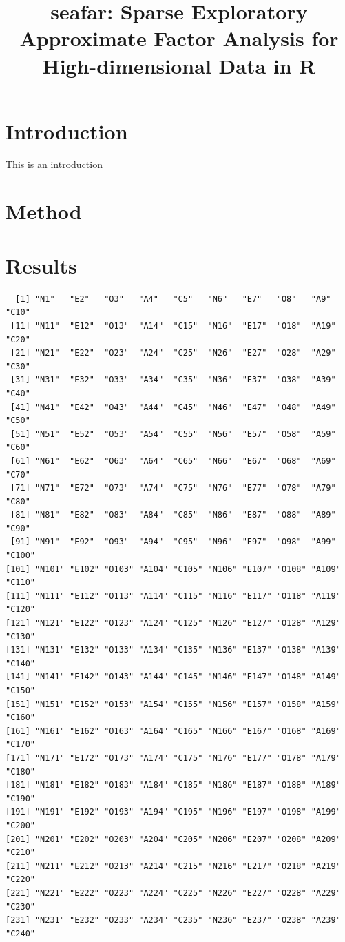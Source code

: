 \documentclass[
  man,
  floatsintext,
  longtable,
  nolmodern,
  notxfonts,
  notimes,
  draftfirst,
  colorlinks=true,linkcolor=blue,citecolor=blue,urlcolor=blue]{apa7}
\title{seafar: Sparse Exploratory Approximate Factor Analysis for
High-dimensional Data in R}
\begin{document}
\maketitle


\setcounter{secnumdepth}{-\maxdimen} %

\setlength\LTleft{0pt}


\linenumbers

\section{Introduction}\label{introduction}

This is an introduction

\section{Method}\label{method}

\section{Results}\label{results}

\begin{verbatim}
  [1] "N1"   "E2"   "O3"   "A4"   "C5"   "N6"   "E7"   "O8"   "A9"   "C10" 
 [11] "N11"  "E12"  "O13"  "A14"  "C15"  "N16"  "E17"  "O18"  "A19"  "C20" 
 [21] "N21"  "E22"  "O23"  "A24"  "C25"  "N26"  "E27"  "O28"  "A29"  "C30" 
 [31] "N31"  "E32"  "O33"  "A34"  "C35"  "N36"  "E37"  "O38"  "A39"  "C40" 
 [41] "N41"  "E42"  "O43"  "A44"  "C45"  "N46"  "E47"  "O48"  "A49"  "C50" 
 [51] "N51"  "E52"  "O53"  "A54"  "C55"  "N56"  "E57"  "O58"  "A59"  "C60" 
 [61] "N61"  "E62"  "O63"  "A64"  "C65"  "N66"  "E67"  "O68"  "A69"  "C70" 
 [71] "N71"  "E72"  "O73"  "A74"  "C75"  "N76"  "E77"  "O78"  "A79"  "C80" 
 [81] "N81"  "E82"  "O83"  "A84"  "C85"  "N86"  "E87"  "O88"  "A89"  "C90" 
 [91] "N91"  "E92"  "O93"  "A94"  "C95"  "N96"  "E97"  "O98"  "A99"  "C100"
[101] "N101" "E102" "O103" "A104" "C105" "N106" "E107" "O108" "A109" "C110"
[111] "N111" "E112" "O113" "A114" "C115" "N116" "E117" "O118" "A119" "C120"
[121] "N121" "E122" "O123" "A124" "C125" "N126" "E127" "O128" "A129" "C130"
[131] "N131" "E132" "O133" "A134" "C135" "N136" "E137" "O138" "A139" "C140"
[141] "N141" "E142" "O143" "A144" "C145" "N146" "E147" "O148" "A149" "C150"
[151] "N151" "E152" "O153" "A154" "C155" "N156" "E157" "O158" "A159" "C160"
[161] "N161" "E162" "O163" "A164" "C165" "N166" "E167" "O168" "A169" "C170"
[171] "N171" "E172" "O173" "A174" "C175" "N176" "E177" "O178" "A179" "C180"
[181] "N181" "E182" "O183" "A184" "C185" "N186" "E187" "O188" "A189" "C190"
[191] "N191" "E192" "O193" "A194" "C195" "N196" "E197" "O198" "A199" "C200"
[201] "N201" "E202" "O203" "A204" "C205" "N206" "E207" "O208" "A209" "C210"
[211] "N211" "E212" "O213" "A214" "C215" "N216" "E217" "O218" "A219" "C220"
[221] "N221" "E222" "O223" "A224" "C225" "N226" "E227" "O228" "A229" "C230"
[231] "N231" "E232" "O233" "A234" "C235" "N236" "E237" "O238" "A239" "C240"
\end{verbatim}
\end{document}

